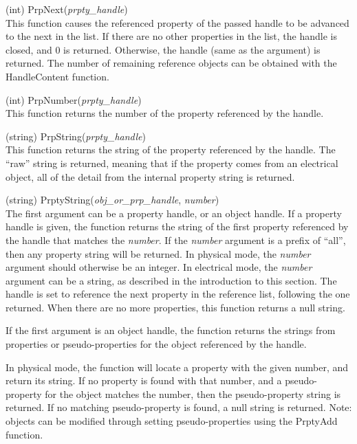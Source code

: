 \begin{description}
\item{(int) \vt PrpNext({\it prpty\_handle})}\\
This function causes the referenced property of the passed handle to
be advanced to the next in the list.  If there are no other properties
in the list, the handle is closed, and 0 is returned.  Otherwise, the
handle (same as the argument) is returned.  The number of remaining
reference objects can be obtained with the {\vt HandleContent} function.

\item{(int) \vt PrpNumber({\it prpty\_handle})}\\
This function returns the number of the property referenced by the
handle.

\item{(string) \vt PrpString({\it prpty\_handle})}\\
This function returns the string of the property referenced by the
handle.  The ``raw'' string is returned, meaning that if the property
comes from an electrical object, all of the detail from the internal
property string is returned.

\item{(string) \vt PrptyString({\it obj\_or\_prp\_handle\/}, {\it number\/})}\\
The first argument can be a property handle, or an object handle.  If
a property handle is given, the function returns the string of the
first property referenced by the handle that matches the {\it number}. 
If the {\it number} argument is a prefix of ``{\vt all}'', then any
property string will be returned.  In physical mode, the {\it number}
argument should otherwise be an integer.  In electrical mode, the {\it
number} argument can be a string, as described in the introduction to
this section.  The handle is set to reference the next property in the
reference list, following the one returned.  When there are no more
properties, this function returns a null string.

If the first argument is an object handle, the function returns the
strings from properties or pseudo-properties for the object referenced
by the handle.

In physical mode, the function will locate a property with the given
number, and return its string.  If no property is found with that
number, and a pseudo-property for the object matches the number, then
the pseudo-property string is returned.  If no matching
pseudo-property is found, a null string is returned.  Note:  objects
can be modified through setting pseudo-properties using the {\vt
PrptyAdd} function.


\end{description}
